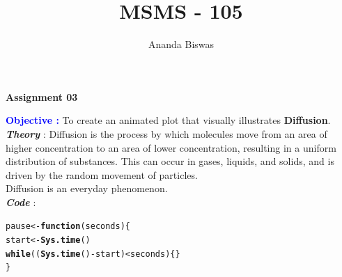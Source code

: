 \documentclass[11pt, a4paper]{article}\usepackage[]{graphicx}\usepackage[]{xcolor}
\title{MSMS - 105}
\author{Ananda Biswas}
\date{}
\makeatletter
\newcommand{\hlopt}[1]{\textcolor[rgb]{0,0,0}{#1}}%
\newcommand{\hldef}[1]{\textcolor[rgb]{0.345,0.345,0.345}{#1}}%
\newcommand{\hlkwa}[1]{\textcolor[rgb]{0.161,0.373,0.58}{\textbf{#1}}}%
\newcommand{\hlkwb}[1]{\textcolor[rgb]{0.69,0.353,0.396}{#1}}%
\newcommand{\hlkwc}[1]{\textcolor[rgb]{0.333,0.667,0.333}{#1}}%
\newcommand{\hlkwd}[1]{\textcolor[rgb]{0.737,0.353,0.396}{\textbf{#1}}}%
\newenvironment{kframe}{%
 \def\at@end@of@kframe{}%
 \ifinner\ifhmode%
  \def\at@end@of@kframe{\end{minipage}}%
  \begin{minipage}{\columnwidth}%
 \fi\fi%
 \def\FrameCommand##1{\hskip\@totalleftmargin \hskip-\fboxsep
 \colorbox{shadecolor}{##1}\hskip-\fboxsep
     \hskip-\linewidth \hskip-\@totalleftmargin \hskip\columnwidth}%
 \MakeFramed {\advance\hsize-\width
   \@totalleftmargin\z@ \linewidth\hsize
   \@setminipage}}%
 {\par\unskip\endMakeFramed%
 \at@end@of@kframe}
\newenvironment{knitrout}{}{} %
\makeatother
\begin{document}
\maketitle

\begin{center}
\textbf{Assignment 03}
\end{center}


\OrnamentDiamondSolid \hspace{0.5cm} \textcolor{blue}{\textbf{Objective :}} To create an animated plot that visually illustrates \textbf{Diffusion}. \\

\faArrowAltCircleRight[regular] \textcolor{col1}{\textbf{\textit{Theory}}} : Diffusion is the process by which molecules move from an area of higher concentration to an area of lower concentration, resulting in a uniform distribution of substances. This can occur in gases, liquids, and solids, and is driven by the random movement of particles. \\

\hspace{1cm} Diffusion is an everyday phenomenon. \\


\faArrowAltCircleRight[regular] \textcolor{col1}{\textbf{\textit{Code}}} : 

\begin{knitrout}\footnotesize
{}\color{fgcolor}\begin{kframe}
\begin{alltt}
\hldef{pause} \hlkwb{<-} \hlkwa{function}\hldef{(}\hlkwc{seconds}\hldef{)\{}
  \hldef{start} \hlkwb{<-} \hlkwd{Sys.time}\hldef{()}
  \hlkwa{while}\hldef{((}\hlkwd{Sys.time}\hldef{()} \hlopt{-} \hldef{start)} \hlopt{<} \hldef{seconds)\{\}}
\hldef{\}}
\end{alltt}
\end{kframe}
\end{knitrout}
\end{document}
